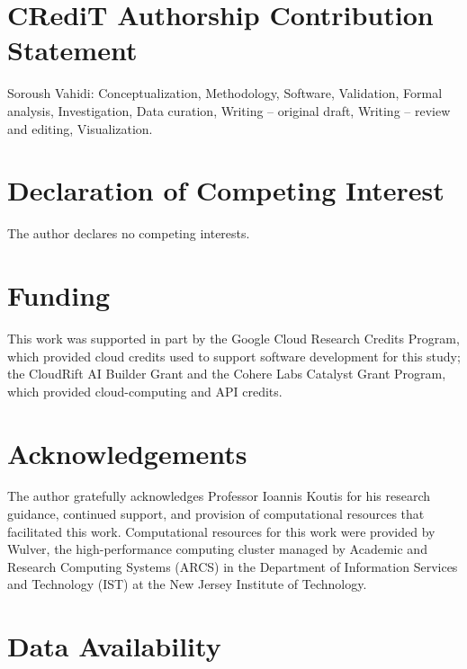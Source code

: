 \section*{CRediT Authorship Contribution Statement}

Soroush Vahidi: Conceptualization, Methodology, Software, Validation,
Formal analysis, Investigation, Data curation, Writing -- original draft,
Writing -- review and editing, Visualization.

\section*{Declaration of Competing Interest}

The author declares no competing interests.

\section*{Funding}

This work was supported in part by the Google Cloud Research Credits
Program, which provided cloud credits used to support software development
for this study; the CloudRift AI Builder Grant and the Cohere Labs Catalyst
Grant Program, which provided cloud-computing and API credits.

\section*{Acknowledgements}

The author gratefully acknowledges Professor Ioannis Koutis for his research
guidance, continued support, and provision of computational resources that
facilitated this work. Computational resources for this work were provided by
Wulver, the high-performance computing cluster managed by Academic and
Research Computing Systems (ARCS) in the Department of Information Services
and Technology (IST) at the New Jersey Institute of Technology.

\section*{Data Availability}

